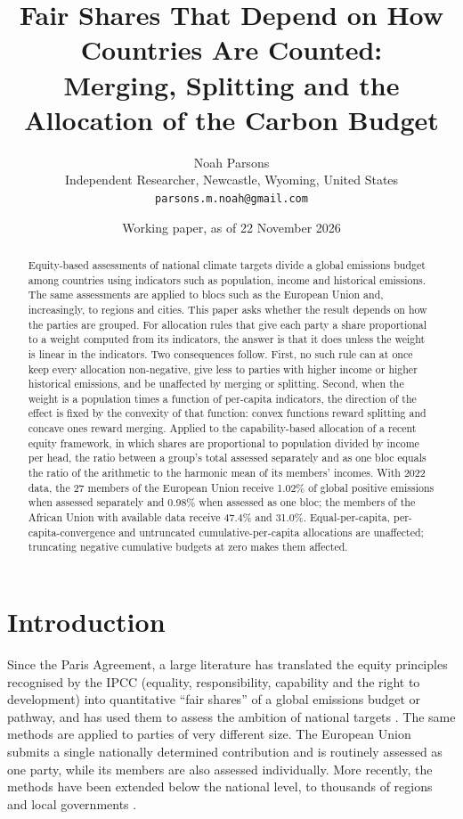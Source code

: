 \documentclass[11pt]{article}
\title{Fair Shares That Depend on How Countries Are Counted:\\ Merging, Splitting and the Allocation of the Carbon Budget}
\author{Noah Parsons\\ \small Independent Researcher, Newcastle, Wyoming, United States\\ \small \texttt{parsons.m.noah@gmail.com}}
\date{Working paper, as of 22 November 2026}
\theoremstyle{definition}
\theoremstyle{remark}
\begin{document}
\maketitle

\begin{abstract}
Equity-based assessments of national climate targets divide a global emissions budget among countries using indicators such as population, income and historical emissions. The same assessments are applied to blocs such as the European Union and, increasingly, to regions and cities. This paper asks whether the result depends on how the parties are grouped. For allocation rules that give each party a share proportional to a weight computed from its indicators, the answer is that it does unless the weight is linear in the indicators. Two consequences follow. First, no such rule can at once keep every allocation non-negative, give less to parties with higher income or higher historical emissions, and be unaffected by merging or splitting. Second, when the weight is a population times a function of per-capita indicators, the direction of the effect is fixed by the convexity of that function: convex functions reward splitting and concave ones reward merging. Applied to the capability-based allocation of a recent equity framework, in which shares are proportional to population divided by income per head, the ratio between a group's total assessed separately and as one bloc equals the ratio of the arithmetic to the harmonic mean of its members' incomes. With 2022 data, the 27 members of the European Union receive 1.02\% of global positive emissions when assessed separately and 0.98\% when assessed as one bloc; the members of the African Union with available data receive 47.4\% and 31.0\%. Equal-per-capita, per-capita-convergence and untruncated cumulative-per-capita allocations are unaffected; truncating negative cumulative budgets at zero makes them affected.
\end{abstract}

\section{Introduction}

Since the Paris Agreement, a large literature has translated the equity principles recognised by the IPCC (equality, responsibility, capability and the right to development) into quantitative ``fair shares'' of a global emissions budget or pathway, and has used them to assess the ambition of national targets \cite{rdp2017,rdp2023}. The same methods are applied to parties of very different size. The European Union submits a single nationally determined contribution and is routinely assessed as one party, while its members are also assessed individually. More recently, the methods have been extended below the national level, to thousands of regions and local governments \cite{multilevel}.
\end{document}
